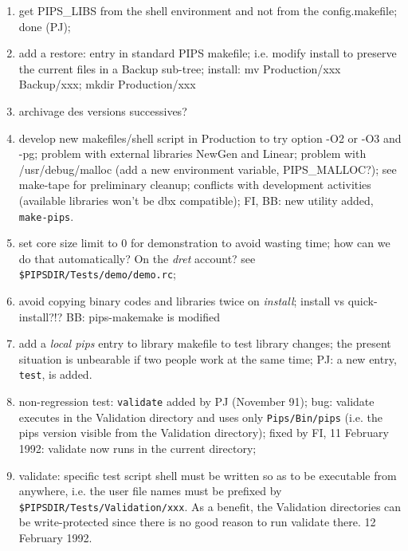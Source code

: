 \begin{enumerate}

  \item get PIPS\_LIBS from the shell environment and not from the
        config.makefile; done (PJ);

  \item add a restore: entry in standard PIPS makefile; i.e. modify install
        to preserve the current files in a Backup sub-tree; install:
        mv Production/xxx Backup/xxx; mkdir Production/xxx

  \item archivage des versions successives?

  \item develop new makefiles/shell script in Production to try option
        -O2 or -O3 and -pg; problem with external libraries NewGen and Linear;
        problem with /usr/debug/malloc (add a new environment variable,
        PIPS\_MALLOC?);
        see make-tape for preliminary cleanup; conflicts with
        development activities (available libraries won't be dbx
        compatible); FI, BB: new utility added, {\tt make-pips}.

  \item set core size limit to 0 for demonstration to avoid wasting time;
        how can we do that automatically? On the {\em dret} account? see
        \verb+$PIPSDIR/Tests/demo/demo.rc+;

  \item avoid copying binary codes and libraries twice on {\em install};
        install vs quick-install?!? BB: pips-makemake is modified

  \item add a {\em local pips} entry to library makefile to test library
        changes; the present situation is unbearable if two people work
        at the same time; PJ: a new entry, {\tt test}, is added.

  \item non-regression test: \verb+validate+ added by PJ (November 91);
        bug: validate executes in the Validation directory and
        uses only \verb+Pips/Bin/pips+ (i.e. the pips version visible
        from the Validation directory); fixed by FI, 11 February 1992:
        validate now runs in the current directory;

  \item validate: specific test script shell must be written so as
        to be executable from anywhere, i.e. the user file names must
        be prefixed by \verb+$PIPSDIR/Tests/Validation/xxx+. As a benefit,
        the Validation directories can be write-protected since there
        is no good reason to run validate there. 12 February 1992.


\end{enumerate}
